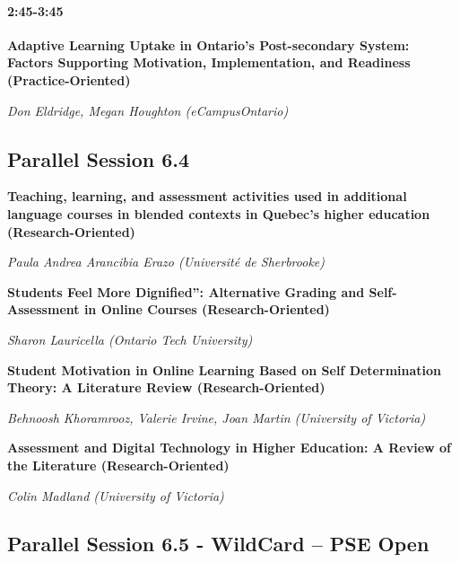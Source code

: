 \documentclass[
]{book}
\begin{document}
\begin{secondary}
\hypertarget{section}{%
\paragraph{2:45-3:45}\label{section}}

\textbf{Adaptive Learning Uptake in Ontario's Post-secondary System:
Factors Supporting Motivation, Implementation, and Readiness
(Practice-Oriented)}

\emph{Don Eldridge, Megan Houghton (eCampusOntario)}
\end{secondary}

\hypertarget{parallel-session-6.4}{%
\subsection*{Parallel Session 6.4}\label{parallel-session-6.4}}

\begin{secondary}
\textbf{Teaching, learning, and assessment activities used in additional
language courses in blended contexts in Quebec's higher education
(Research-Oriented)}

\emph{Paula Andrea Arancibia Erazo (Université de Sherbrooke)}
\end{secondary}

\begin{secondary}
\textbf{Students Feel More Dignified'': Alternative Grading and
Self-Assessment in Online Courses (Research-Oriented)}

\emph{Sharon Lauricella (Ontario Tech University)}
\end{secondary}

\begin{secondary}
\textbf{Student Motivation in Online Learning Based on Self
Determination Theory: A Literature Review (Research-Oriented)}

\emph{Behnoosh Khoramrooz, Valerie Irvine, Joan Martin (University of
Victoria)}
\end{secondary}

\begin{secondary}
\textbf{Assessment and Digital Technology in Higher Education: A Review
of the Literature (Research-Oriented)}

\emph{Colin Madland (University of Victoria)}
\end{secondary}

\hypertarget{parallel-session-6.5---wildcard-pse-open}{%
\subsection*{Parallel Session 6.5 - WildCard -- PSE Open}\label{parallel-session-6.5---wildcard-pse-open}}
\end{document}
